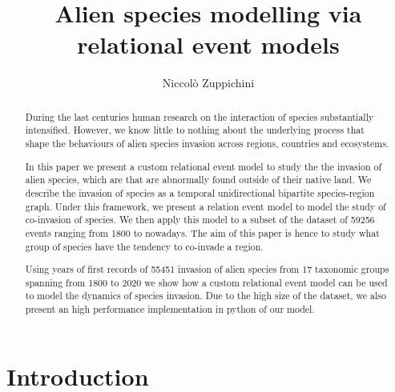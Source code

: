 \documentclass[mscthesis]{usiinfthesis}
\title{Alien species modelling via relational event models} %
\author{Niccol\`o Zuppichini} %
\newcommand\numberevents{59256 }
\begin{document}
\maketitle %

\frontmatter %

\begin{abstract}
During the last centuries human research on the interaction of species substantially intensified. However, we know little to nothing about the underlying process that shape the behaviours of alien species invasion across regions, countries and ecosystems.

In this paper we present a custom relational event model to study the the invasion of alien species, which are that are abnormally found outside of their native land. We describe the invasion of species as a temporal unidirectional bipartite species-region graph. Under this framework, we present a relation event model to model the study of co-invasion of species. We then apply this model to a subset of the dataset of \numberevents events ranging from 1800 to nowadays. The aim of this paper is hence to study what group of species have the tendency to co-invade a region.

Using years of first records of 55451 invasion of alien species from 17 taxonomic groups spanning from 1800 to 2020 we show how a custom relational event model can be used to model the dynamics of species invasion. Due to the high size of the dataset, we also present an high performance implementation in python of our model.


\end{abstract}



\mainmatter

\chapter{Introduction}
\end{document}
